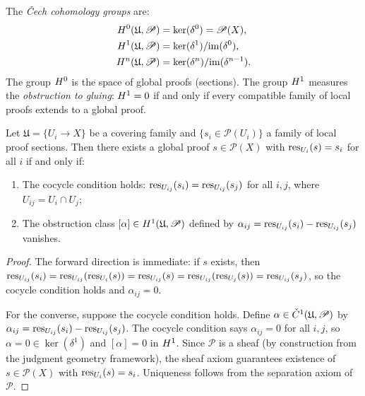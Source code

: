 \documentclass[11pt]{article}
\newcommand{\ProofSheaf}{\mathscr{P}}
\begin{document}
\begin{definition}\label{def:cech-cohomology}
The \emph{\v{C}ech cohomology groups} are:
\begin{align*}
  \Hcoh{0}(\mathfrak{U}, \ProofSheaf)
    &= \ker(\delta^0) = \ProofSheaf(X), \\
  \Hcoh{1}(\mathfrak{U}, \ProofSheaf)
    &= \ker(\delta^1) / \mathrm{im}(\delta^0), \\
  \Hcoh{n}(\mathfrak{U}, \ProofSheaf)
    &= \ker(\delta^n) / \mathrm{im}(\delta^{n-1}).
\end{align*}
The group $H^{0}$ is the space of global proofs (sections).
The group $H^{1}$ measures the \emph{obstruction to gluing}:
$H^{1} = 0$ if and only if every compatible family of local proofs
extends to a global proof.
\end{definition}

\begin{theorem}\label{thm:gluing-criterion}
Let $\mathfrak{U} = \{U_i \to X\}$ be a covering family and
$\{s_i \in \ProofSheaf(U_i)\}$ a family of local proof sections.
Then there exists a global proof $s \in \ProofSheaf(X)$ with
$\mathrm{res}_{U_i}(s) = s_i$ for all $i$ if and only if:
\begin{enumerate}[label=(\roman*)]
  \item The cocycle condition holds:
    $\mathrm{res}_{U_{ij}}(s_i) = \mathrm{res}_{U_{ij}}(s_j)$ for all $i, j$, where
    $U_{ij} = U_i \cap U_j$;
  \item The obstruction class $[\alpha] \in \Hcoh{1}(\mathfrak{U}, \ProofSheaf)$
    defined by $\alpha_{ij} = \mathrm{res}_{U_{ij}}(s_i) - \mathrm{res}_{U_{ij}}(s_j)$
    vanishes.
\end{enumerate}
\end{theorem}

\begin{proof}
The forward direction is immediate: if $s$ exists, then
$\mathrm{res}_{U_{ij}}(s_i) = \mathrm{res}_{U_{ij}}(\mathrm{res}_{U_i}(s))
= \mathrm{res}_{U_{ij}}(s) = \mathrm{res}_{U_{ij}}(\mathrm{res}_{U_j}(s))
= \mathrm{res}_{U_{ij}}(s_j)$, so the cocycle condition holds and
$\alpha_{ij} = 0$.

For the converse, suppose the cocycle condition holds.  Define
$\alpha \in \Cech^1(\mathfrak{U}, \ProofSheaf)$ by
$\alpha_{ij} = \mathrm{res}_{U_{ij}}(s_i) - \mathrm{res}_{U_{ij}}(s_j)$.
The cocycle condition says $\alpha_{ij} = 0$ for all $i, j$,
so $\alpha = 0 \in \ker(\delta^1)$ and $[\alpha] = 0$ in
$H^{1}$.  Since $\ProofSheaf$ is a sheaf (by construction from
the judgment geometry framework), the sheaf axiom guarantees existence
of $s \in \ProofSheaf(X)$ with $\mathrm{res}_{U_i}(s) = s_i$.  Uniqueness
follows from the separation axiom of $\ProofSheaf$.
\end{proof}
\end{document}
